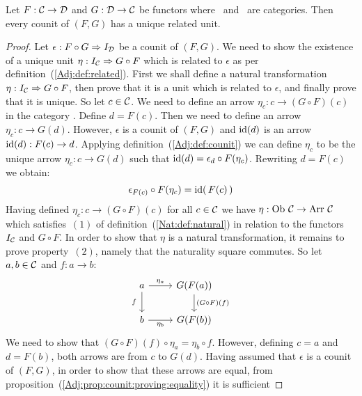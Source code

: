 \begin{prop}\label{Adj:prop:counit:has:related:unit}
    Let $F:\mbox{$\cal C$}\to\mbox{$\cal D$}$ and $G:\mbox{$\cal D$}\to\mbox{$\cal C$}$ be functors where \Cat\ and \Dat\ 
    are categories. Then every counit of $(F,G)$ has a unique related unit.
\end{prop}
\begin{proof}
    Let $\epsilon:F\circ G\Rightarrow I_{\cal D}$ be a counit of $(F,G)$. We need 
    to show the existence of a unique unit $\eta:I_{\cal C}\Rightarrow G\circ F$ 
    which is related to $\epsilon$ as per definition~(\ref{Adj:def:related}).
    First we shall define a natural transformation $\eta:I_{\cal C}\Rightarrow
    G\circ F$, then prove that it is a unit which is related
    to $\epsilon$, and finally prove that it is unique. So let $c\in\mbox{$\cal C$}$. 
    We need to define an arrow $\eta_{c}:
    c\to(G\circ F)(c)$ in the category \Cat. Define $d=F(c)$. Then we need
    to define an arrow $\eta_{c}:c\to G(d)$. However, $\epsilon$ is a counit
    of $(F,G)$ and $\mbox{\rm id}(d)$ is an arrow $\mbox{\rm id}(d):F(c)\to d$. Applying
    definition~(\ref{Adj:def:counit}) we can define $\eta_{c}$ to be
    the unique arrow $\eta_{c}:c\to G(d)$ such that $\mbox{\rm id}(d)=\epsilon_{d}
    \circ F(\eta_{c})$. Rewriting $d=F(c)$ we obtain:
        \begin{equation}\label{Adj:eqn:counit:has:related:unit:1}
            \epsilon_{F(c)}\circ F(\eta_{c})=\mbox{\rm id}(\,F(c)\,)
        \end{equation}
    Having defined $\eta_{c}:c\to(G\circ F)(c)$ for all $c\in\mbox{$\cal C$}$ we have 
    $\eta:\mbox{\rm Ob}\ \mbox{$\cal C$}\to\mbox{\rm Arr}\ \mbox{$\cal C$}$ which satisfies~$(1)$ of 
    definition~(\ref{Nat:def:natural}) in relation to the functors $I_{\cal C}$
    and $G\circ F$. In order to show that $\eta$ is a natural 
    transformation, it remains to prove property~$(2)$, namely that the 
    naturality square commutes. So let $a,b\in\mbox{$\cal C$}$ and $f:a\to b$:
    \[
        \begin{tikzcd}
            a\arrow[r, "\eta_{a}"]\arrow[d, swap,"f\ "]
            &G(F(a))\arrow[d, "(G\circ F)(f)"]
            \\
            b\arrow[r, swap, "\eta_{b}"]
            &G(F(b))
        \end{tikzcd}
    \]
    We need to show that $(G\circ F)(f)\circ\eta_{a}=\eta_{b}\circ f$.
    However, defining $c=a$ and $d=F(b)$, both arrows are from $c$ to $G(d)$.
    Having assumed that $\epsilon$ is a counit of $(F,G)$, in order to show that
    these arrows are equal, 
    from proposition~(\ref{Adj:prop:counit:proving:equality}) it is sufficient

\end{proof}
